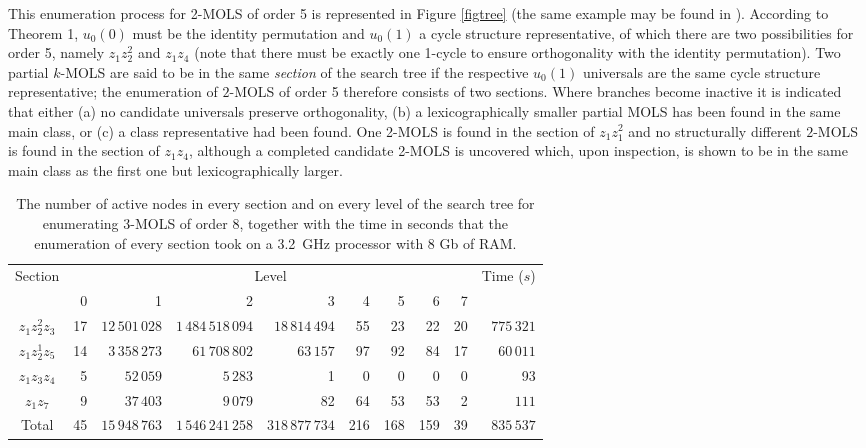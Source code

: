 \documentclass[11pt, a4paper]{article}
\newcounter{ls}
\begin{document}
This enumeration process for 2-MOLS of order 5 is represented  in Figure \ref{figtree} (the same example may be found in \cite{Kidd2012}).  According to Theorem 1, $u_0{(0)}$ must be the identity permutation and $u_0{(1)}$ a cycle structure representative, of which there are two possibilities for order 5, namely $z_1z_2^2$ and $z_1z_4$ (note that there must be exactly one 1-cycle to ensure orthogonality with the identity permutation).  Two partial $k$-MOLS are said to be in the same \emph{section} of the search tree if the respective $u_0{(1)}$ universals are the same cycle structure representative; the enumeration of $2$-MOLS of order 5 therefore consists of two sections.
Where branches become inactive it is indicated that either (a) no candidate universals preserve orthogonality,  (b) a lexicographically smaller partial MOLS has been found in the same main class, or   (c) a class representative had been found. 
One 2-MOLS is found in the section of $z_1z_1^2$ and no structurally different $2$-MOLS is found  in the section of $z_1z_4$,  although a completed candidate 2-MOLS is uncovered which, upon inspection, is shown to be in the same main class  as the first one but lexicographically larger.
  \begin{table}[b]
 \centering
\begin{tabular}{crrrrrrrrr}
\toprule
Section& \multicolumn{8}{c}{Level}& Time ($s$)\\
\cmidrule(lr){2-9}
 & 0 & 1 & 2 & 3 & 4 & 5 & 6 & 7 &   \\ \midrule 
$z_1z_2^2z_3$ &17 & $12\,501\,028$ & $1\,484\,518\,094$ & $18\,814\,494$ & 55 & 23 & 22 & 20 & $775\,321$ \\ 
$z_1z_2^1z_5$ &14 & $3\,358\,273$ & $61\,708\,802$ & $63\,157$ & 97 & 92 & 84 & 17 & $60\,011$ \\ 
$z_1z_3z_4$ &5 & $52\,059$ & $5\,283$ & 1 & 0 & 0 & 0 & 0 & 93 \\ 
$z_1z_7$ &9 & $37\,403$ & $9\,079$ & 82 & 64 & 53 & 53 & 2 & $111$ \\ \midrule
Total &45 & $15\,948\,763$ & $1\,546\,241\,258$ & $318\,877\,734$ & 216 & 168 & 159 & 39 & $835\,537$ \\ \bottomrule
\end{tabular}\vspace*{.4cm}
\caption{The number of active nodes in every section and on every level of the search tree for enumerating   3-MOLS of order 8, together with the time in seconds that the enumeration of every section took on a 3.2~GHz processor with 8 Gb of RAM.}
\label{83}
\end{table}
\end{document}
